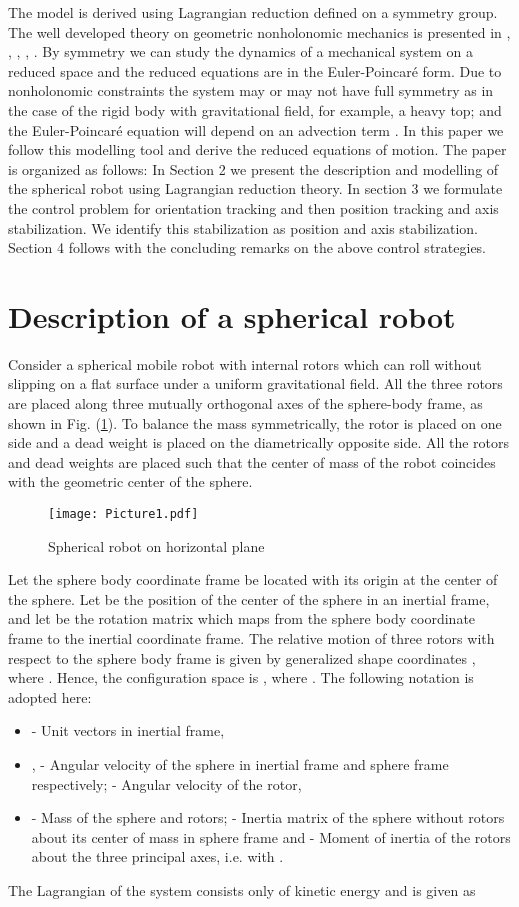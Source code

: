\documentclass{ifacconf}
\begin{document}
The model is derived using Lagrangian reduction defined on a symmetry group. The well developed theory on geometric nonholonomic mechanics is presented in \citep{marsden}, \citep{CMR}, \citep{CHMR}, \citep{BKMM}, \citep{bloch2003}. By symmetry we can study the dynamics of a mechanical system on a reduced space and the reduced equations are in the Euler-Poincar\'{e} form. Due to nonholonomic constraints the system may or may not have full symmetry as in the case of the rigid body with gravitational field, for example, a heavy top; and the Euler-Poincar\'{e} equation will depend on an advection term \citep{schneider}. In this paper we follow this modelling tool and derive the reduced equations of motion. The paper is organized as follows: In Section 2 we present the description and modelling of the spherical robot using Lagrangian reduction theory. In section 3 we formulate the control problem for orientation tracking and then position tracking and axis stabilization. We identify this stabilization as position and axis stabilization. Section 4 follows with the concluding remarks on the above control strategies.

\section{Description of a spherical robot}
Consider a spherical mobile robot  with internal rotors which can roll without slipping on a flat surface under a uniform gravitational field. All the three rotors are placed along three mutually orthogonal axes of the sphere-body frame, as shown in Fig. (\ref{rotor_fig}). To balance the mass symmetrically, the rotor is placed on one side and a dead weight is placed on the diametrically opposite side. All the rotors and dead weights are placed such that the center of mass of the robot coincides with the geometric center of the sphere. 
\begin{figure}[h]
\centering
\texttt{[image: Picture1.pdf]}
\caption{Spherical robot on horizontal plane}
\label{rotor_fig}
\end{figure}
Let the sphere body coordinate frame be located with its origin at the center of the sphere. Let  be the position of the center of the sphere in an inertial frame, and let  be the rotation matrix which maps from the sphere body coordinate frame to the inertial coordinate frame. The relative motion of three rotors with respect to the sphere body frame is given by generalized shape coordinates ,  where . Hence, the configuration space is , where . The following notation is adopted here:
\begin{itemize}
\item  - Unit vectors in inertial frame,
\item ,  - Angular velocity of the sphere in inertial frame and sphere frame respectively;  - Angular velocity of the  rotor,
\item  - Mass of the sphere and  rotors;  - Inertia matrix of the sphere without rotors about its center of mass in sphere frame and  - Moment of inertia of the rotors about the three principal axes, i.e.  with .
\end{itemize}
The Lagrangian of the system consists only of kinetic energy and is given as
\end{document}
